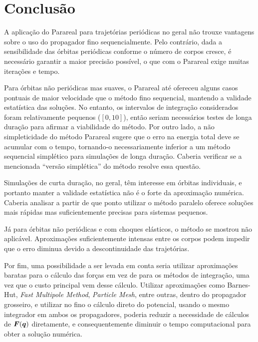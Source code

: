 \section{Conclusão}

A aplicação do Parareal para trajetórias periódicas no geral não trouxe vantagens sobre o uso do propagador fino sequencialmente. Pelo contrário, dada a sensibilidade das órbitas periódicas conforme o número de corpos cresce, é necessário garantir a maior precisão possível, o que com o Parareal exige muitas iterações e tempo.

Para órbitas não periódicas mas suaves, o Parareal até ofereceu alguns casos pontuais de maior velocidade que o método fino sequencial, mantendo a validade estatística das soluções. No entanto, os intervalos de integração considerados foram relativamente pequenos ($[0,10]$), então seriam necessários testes de longa duração para afirmar a viabilidade do método. Por outro lado, a não simpleticidade do método Parareal sugere que o erro na energia total deve se acumular com o tempo, tornando-o necessariamente inferior a um método sequencial simplético para simulações de longa duração. Caberia verificar se a mencionada ``versão simplética'' do método resolve essa questão.

Simulações de curta duração, no geral, têm interesse em órbitas individuais, e portanto manter a validade estatística não é o forte da aproximação numérica. Caberia analisar a partir de que ponto utilizar o método paralelo oferece soluções mais rápidas mas suficientemente precisas para sistemas pequenos.

Já para órbitas não periódicas e com choques elásticos, o método se mostrou não aplicável. Aproximações suficientemente intensas entre os corpos podem impedir que o erro diminua devido a descontinuidade das trajetórias.

Por fim, uma possibilidade a ser levada em conta seria utilizar aproximações baratas para o cálculo das forças em vez de para os métodos de integração, uma vez que o custo principal vem desse cálculo. Utilizar aproximações como Barnes-Hut, \textit{Fast Multipole Method}, \textit{Particle Mesh}, entre outras, dentro do propagador grosseiro, e utilizar no fino o cálculo direto do potencial, usando o mesmo integrador em ambos os propagadores, poderia reduzir a necessidade de cálculos de $\bm F(\bm q)$ diretamente, e consequentemente diminuir o tempo computacional para obter a solução numérica.